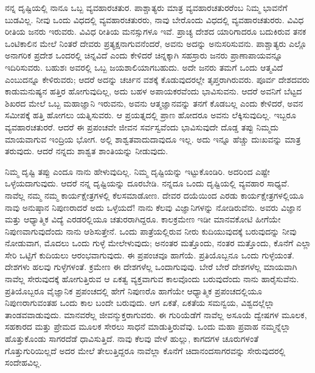 \vskip 0.2cm 

ನನ್ನ ದೃಷ್ಟಿಯಲ್ಲಿ ನಾನೂ ಒಬ್ಬ ವ್ಯವಹಾರಚತುರ. ಪಾಶ್ಚಾತ್ಯರು ಮಾತ್ರ ವ್ಯವಹಾರಚತುರರೆಂಬ ನಿಮ್ಮ ಭಾವನೆಗೆ ಬುಡವಿಲ್ಲ. ನೀವು ಒಂದು ವಿಧದಲ್ಲಿ ವ್ಯವಹಾರಚತುರರು, ನಾವು ಬೇರೊಂದು ವಿಧದಲ್ಲಿ ವ್ಯವಹಾರಚತುರರು. ವಿವಿಧ ರೀತಿಯ ಜನರು ಇರುವರು. ವಿವಿಧ ರೀತಿಯ ಮನಸ್ಸುಗಳೂ ಇವೆ. ಪ್ರಾಚ್ಯ ದೇಶದ ಯಾರಿಗಾದರೂ ಬದುಕಿರುವ ತನಕ ಒಂಟಿಕಾಲಿನ ಮೇಲೆ ನಿಂತರೆ ದೇವರು ಪ್ರತ್ಯಕ್ಷನಾಗುವನೆಂದರೆ, ಅವನು ಅದನ್ನು ಅನುಸರಿಸುವನು. ಪಾಶ್ಚಾತ್ಯರು ಎಲ್ಲೊ ಅನಾಗರಿಕ ಪ್ರದೇಶ ಒಂದರಲ್ಲಿ ಚಿನ್ನವಿದೆ ಎಂದು ಕೇಳಿದರೆ ಚಿನ್ನಕ್ಕಾಗಿ ಸಹಸ್ರಾರು ಜನರು ಪ್ರಾಣಾಪಾಯವನ್ನೂ ಇದಿರಿಸುವರು. ಬಹುಶಃ ಅವರಲ್ಲಿ ಒಬ್ಬ ಜಯಶಾಲಿಯಾಗಬಹುದು. ಅದೇ ಜನರು ತಮಗೆ ಒಂದು ಆತ್ಮವಿದೆ ಎಂಬುದನ್ನೂ ಕೇಳಿರುವರು; ಆದರೆ ಅದನ್ನು ಚರ್ಚಿನ ವಶಕ್ಕೆ ಕೊಡುವುದರಲ್ಲೇ ತೃಪ್ತರಾಗಿರುವರು. ಪೂರ್ವ ದೇಶದವರು ಕಾಡುಮನುಷ್ಯನ ಹತ್ತಿರ ಹೋಗುವುದಿಲ್ಲ, ಅದು ಬಹಳ ಅಪಾಯಕರವೆಂದು ಭಾವಿಸುವನು. ಆದರೆ ಅವನಿಗೆ ಬೆಟ್ಟದ ಶಿಖರದ ಮೇಲೆ ಒಬ್ಬ ಮಹಾಜ್ಞಾನಿ ಇರುವನು, ಅವನು ಆತ್ಮಜ್ಞಾನವನ್ನು ತನಗೆ ಕೊಡಬಲ್ಲ ಎಂದು ಕೇಳಿದರೆ, ಅವನ ಸಮೀಪಕ್ಕೆ ಹತ್ತಿ ಹೋಗಲು ಯತ್ನಿಸುವರು. ಆ ಪ್ರಯತ್ನದಲ್ಲಿ ಪ್ರಾಣ ಹೋದರೂ ಅವನು ಲೆಕ್ಕಿಸುವುದಿಲ್ಲ. ಇಬ್ಬರೂ ವ್ಯವಹಾರಚತುರರೆ. ಆದರೆ ಈ ಪ್ರಪಂಚವೇ ಜೀವನ ಸರ್ವಸ್ವವೆಂದು ಭಾವಿಸುವುದೇ ದೊಡ್ಡ ತಪ್ಪು ನಿಮ್ಮದು ಮಾಯವಾಗುವ ಇಂದ್ರಿಯ ಭೋಗ. ಅಲ್ಲಿ ಶಾಶ್ವತವಾದುದಾವುದೂ ಇಲ್ಲ. ಅದು ಇನ್ನೂ ಹೆಚ್ಚು ದುಃಖವನ್ನು ಮಾತ್ರ ತರುವುದು. ಆದರೆ ನನ್ನದು ಶಾಶ್ವತ ಶಾಂತಿಯನ್ನು ನೀಡುವುದು.

\vskip 0.2cm 

ನಿಮ್ಮ ದೃಷ್ಟಿ ತಪ್ಪು ಎಂದೂ ನಾನು ಹೇಳುವುದಿಲ್ಲ. ನಿಮ್ಮ ದೃಷ್ಟಿಯನ್ನು ಇಟ್ಟುಕೊಂಡಿರಿ. ಅದರಿಂದ ಎಷ್ಟೇ ಒಳ್ಳೆಯದಾಗುವುದು. ಆದರೆ ನನ್ನ ದೃಷ್ಟಿಯನ್ನು ದೂರಬೇಡಿ. ನನ್ನದೂ ಒಂದು ದೃಷ್ಟಿಯಲ್ಲಿ ವ್ಯವಹಾರ ಸಾಧ್ಯವೆ. ನಾವೆಲ್ಲ ನಮ್ಮ ನಮ್ಮ ಕಾರ್ಯಕ್ಷೇತ್ರಗಳಲ್ಲಿ ಕೆಲಸಮಾಡೋಣ. ದೇವರ ದಯೆಯಿಂದ ಎರಡು ಕಾರ್ಯಕ್ಷೇತ್ರಗಳಲ್ಲಿಯೂ ನಾವು ಅನುಷ್ಠಾನ ನಿಪುಣರಾದರೆ ಅದು ಒಳ್ಳೆಯದೆ! ನಾನು ಕೆಲವು ವಿಜ್ಞಾನಿಗಳನ್ನು ನೋಡಿರುವೆನು. ಅವರು ವಿಜ್ಞಾನ ಮತ್ತು ಆಧ್ಯಾತ್ಮಿಕ ವಿದ್ಯೆ ಎರಡರಲ್ಲಿಯೂ ಚತುರರಾಗಿದ್ದರೂ. ಕಾಲಕ್ರಮೇಣ ಇಡೀ ಮಾನವಕೋಟಿ ಹೀಗೆಯೇ ನಿಪುಣವಾಗುವುದೆಂದು ನಾನು ಆಶಿಸುತ್ತೇನೆ. ಒಂದು ಪಾತ್ರೆಯಲ್ಲಿರುವ ನೀರು ಕುದಿಯುವುದಕ್ಕೆ ಬರುವುದನ್ನು ನೀವು ನೋಡುವಾಗ, ಮೊದಲು ಒಂದು ಗುಳ್ಳೆ ಮೇಲೇಳುವುದು; ಅನಂತರ ಮತ್ತೊಂದು, ನಂತರ ಮತ್ತೊಂದು, ಕೊನೆಗೆ ಎಲ್ಲಾ ಸೇರಿ ಒಟ್ಟಿಗೆ ಕುದಿಯಲು ಆರಂಭವಾಗುವುದು. ಈ ಪ್ರಪಂಚವೂ ಹಾಗೆಯೆ. ಪ್ರತಿಯೊಬ್ಬನೂ ಒಂದು ಗುಳ್ಳೆಯಂತೆ. ದೇಶಗಳು ಹಲವು ಗುಳ್ಳೆಗಳಂತೆ. ಕ್ರಮೇಣ ಈ ದೇಶಗಳೆಲ್ಲ ಒಂದಾಗುವುವು. ಬೇರೆ ಬೇರೆ ದೇಶಗಳೆಲ್ಲ ಮಾಯವಾಗಿ ನಾವೆಲ್ಲ ಸೇರುವುದಕ್ಕೆ ಹೋಗುತ್ತಿರುವ ಆ ಏಕತ್ವ ವ್ಯಕ್ತವಾಗುವ ಕಾಲವೊಂದು ಬರುವುದೆಂದು ನಾನು ಹಾರೈಸುವೆನು. ಪ್ರತಿಯೊಬ್ಬರೂ ವೈಜ್ಞಾನಿಕ ಪ್ರಪಂಚದಲ್ಲಿ ಹೇಗೆ ನಿಪುಣರೊ ಹಾಗೆಯೇ ಆಧ್ಯಾತ್ಮಿಕ ಪ್ರಪಂಚದಲ್ಲಿಯೂ ನಿಪುಣರಾಗುವಂತಹ ಒಂದು ಕಾಲ ಬಂದೇ ಬರುವುದು. ಆಗ ಏಕತೆ, ಏಕತೆಯ ಸಮನ್ವಯ, ವಿಶ್ವದಲ್ಲೆಲ್ಲಾ ತಾಂಡವವಾಡುವುದು. ಮಾನವರೆಲ್ಲ ಜೀವನ್ಮುಕ್ತರಾಗುವರು. ಈ ಗುರಿಯೆಡೆಗೆ ನಾವೆಲ್ಲ ಅಸೂಯೆ ದ್ವೇಷಗಳ ಮೂಲಕ, ಸಹಕಾರದ ಮತ್ತು ಪ್ರೇಮದ ಮೂಲಕ ಸೇರಲು ಸಾಧನೆ ಮಾಡುತ್ತಿರುವೆವು. ಒಂದು ಮಹಾ ಪ್ರವಾಹ ನಮ್ಮನ್ನೆಲ್ಲಾ ಹೊತ್ತುಕೊಂಡು ಸಾಗರದೆಡೆ ಧಾವಿಸುತ್ತಿದೆ. ನಾವು ಕೆಲವು ವೇಳೆ ಹುಲ್ಲು, ಕಾಗದಗಳ ಚೂರುಗಳಂತೆ ಗೊತ್ತುಗುರಿಯಿಲ್ಲದೆ ಅದರ ಮೇಲೆ ತೇಲುತ್ತಿದ್ದರೂ ನಾವೆಲ್ಲಾ ಕೊನೆಗೆ ಚಿದಾನಂದಸಾಗರವನ್ನು ಸೇರುವುದರಲ್ಲಿ ಸಂದೇಹವಿಲ್ಲ.

